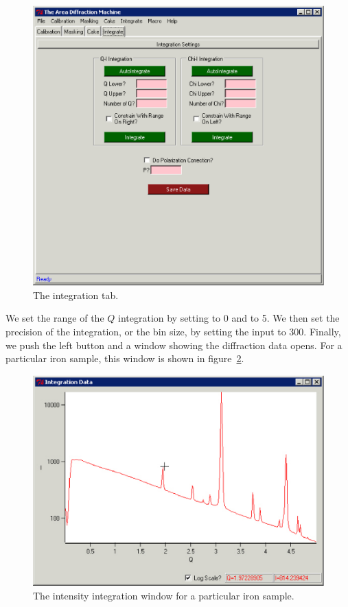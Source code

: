 \begin{figure}
    \centering
    \includegraphics[scale=.75]{figures/integration_page.eps}
    \caption{The integration tab.}
    \label{integration_page_example}
\end{figure}

We set the range of the $Q$ integration by setting
 to 0 and  to 5. We
then set the precision of the integration, or the
bin size, by setting the  input
to 300. Finally, we push the left 
button and a window showing the diffraction data
opens. For a particular iron sample, this window
is shown in figure~\ref{iron_intensity}.

\begin{figure}
    \centering
    \includegraphics[scale=.75]{figures/iron_intensity.eps}
    \caption{The intensity integration window for 
    a particular iron sample.}
    \label{iron_intensity}
\end{figure}


